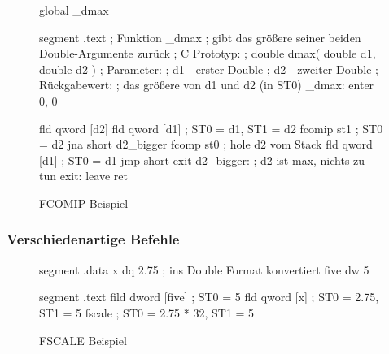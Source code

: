 \begin{figure}[ht]
\begin{AsmCodeListing}[frame=single, numbers=left, commandchars=\\\{\}]
 global _dmax

 segment .text
 ; Funktion _dmax
 ; gibt das gr\"{o}{\ss}ere seiner beiden Double-Argumente zur\"{u}ck
 ; C Prototyp:
 ; double dmax( double d1, double d2 )
 ; Parameter:
 ;   d1   - erster Double
 ;   d2   - zweiter Double
 ; R\"{u}ckgabewert:
 ;   das gr\"{o}{\ss}ere von d1 und d2 (in ST0)
 _dmax:
      enter   0, 0

      fld     qword [d2]
      fld     qword [d1]      ; ST0 = d1, ST1 = d2
      fcomip  st1             ; ST0 = d2
      jna     short d2_bigger
      fcomp   st0             ; hole d2 vom Stack
      fld     qword [d1]      ; ST0 = d1
      jmp     short exit
 d2_bigger:                   ; d2 ist max, nichts zu tun
 exit:
      leave
      ret
\end{AsmCodeListing}
\caption{{\code FCOMIP} Beispiel \label{fig:fcomipEx}}
\end{figure}

\pagebreak[4]
\subsubsection{Verschiedenartige Befehle}

\begin{figure}[t]
\begin{AsmCodeListing}[frame=single, numbers=left]
 segment .data
 x    dq     2.75             ; ins Double Format konvertiert
 five dw     5

 segment .text
      fild   dword [five]     ; ST0 = 5
      fld    qword [x]        ; ST0 = 2.75, ST1 = 5
      fscale                  ; ST0 = 2.75 * 32, ST1 = 5
\end{AsmCodeListing}
\caption{{\code FSCALE} Beispiel \label{fig:fscaleEx}}
\end{figure}

